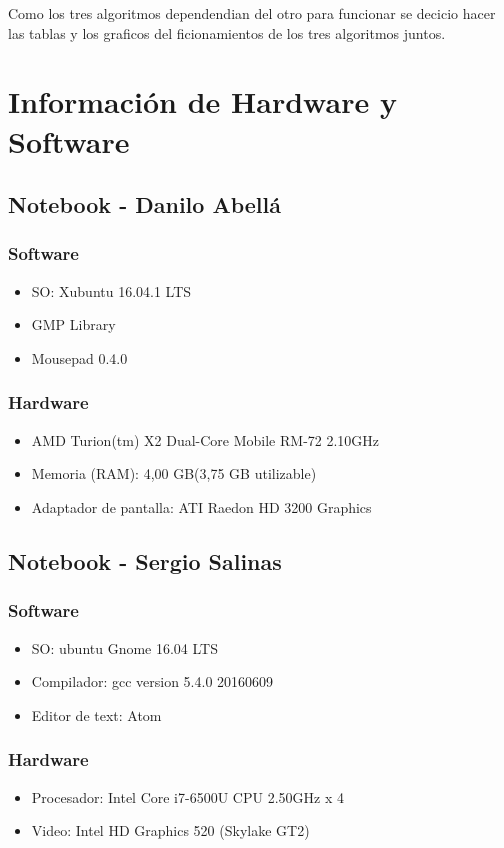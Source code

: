 \documentclass[12pt,letterpaper]{scrartcl}
\begin{document}
Como los tres algoritmos dependendian del otro para funcionar se decicio hacer las tablas y los graficos del ficionamientos de los tres algoritmos juntos.
\newpage

\section{Información de Hardware y Software}


\subsection{ Notebook - Danilo Abellá}
\subsubsection{Software}
\begin{itemize}
\item SO: Xubuntu 16.04.1 LTS
\item GMP Library
\item Mousepad 0.4.0
\end{itemize}

\subsubsection{Hardware}
\begin{itemize}
\item AMD Turion(tm) X2 Dual-Core Mobile RM-72 2.10GHz
\item Memoria (RAM): 4,00 GB(3,75 GB utilizable)
\item Adaptador de pantalla: ATI Raedon HD 3200 Graphics
\end{itemize}



\subsection{Notebook - Sergio Salinas}
\subsubsection{Software}
\begin{itemize}
\item  SO: ubuntu Gnome 16.04 LTS
\item Compilador: gcc version 5.4.0 20160609 
\item Editor de text: Atom
\end{itemize}

\subsubsection{Hardware}
\begin{itemize}
\item Procesador: Intel Core i7-6500U CPU  2.50GHz x 4 
\item Video: Intel HD Graphics 520 (Skylake GT2) 
\end{itemize}
\newpage
\end{document}

